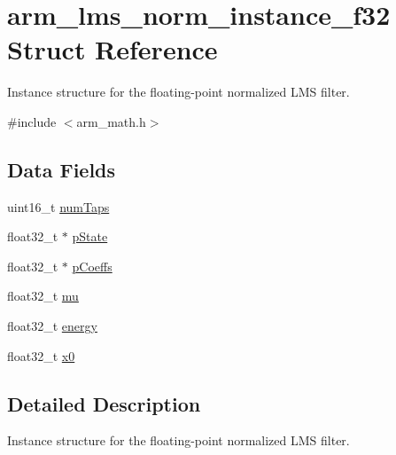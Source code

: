 \hypertarget{structarm__lms__norm__instance__f32}{\section{arm\-\_\-lms\-\_\-norm\-\_\-instance\-\_\-f32 Struct Reference}
\label{structarm__lms__norm__instance__f32}
}


Instance structure for the floating-\/point normalized L\-M\-S filter.  




{\ttfamily \#include $<$arm\-\_\-math.\-h$>$}

\subsection*{Data Fields}
\begin{DoxyCompactItemize}
\item 
uint16\-\_\-t \hyperlink{structarm__lms__norm__instance__f32_a751941891e47f522a7f5375fe8990aac}{num\-Taps}
\item 
float32\-\_\-t $\ast$ \hyperlink{structarm__lms__norm__instance__f32_a335c87e6fdc4b96601d95a5de8b9c463}{p\-State}
\item 
float32\-\_\-t $\ast$ \hyperlink{structarm__lms__norm__instance__f32_aacbb8dd8eeba4b21fc2bb40076405ee3}{p\-Coeffs}
\item 
float32\-\_\-t \hyperlink{structarm__lms__norm__instance__f32_a11402afa7c9b9dac4cb953fa386e74d2}{mu}
\item 
float32\-\_\-t \hyperlink{structarm__lms__norm__instance__f32_ae1ed544b72f1510ed55d144a9424fddd}{energy}
\item 
float32\-\_\-t \hyperlink{structarm__lms__norm__instance__f32_ab56b6f83c5b324c3ef620474b6e5a6e1}{x0}
\end{DoxyCompactItemize}


\subsection{Detailed Description}
Instance structure for the floating-\/point normalized L\-M\-S filter. 

